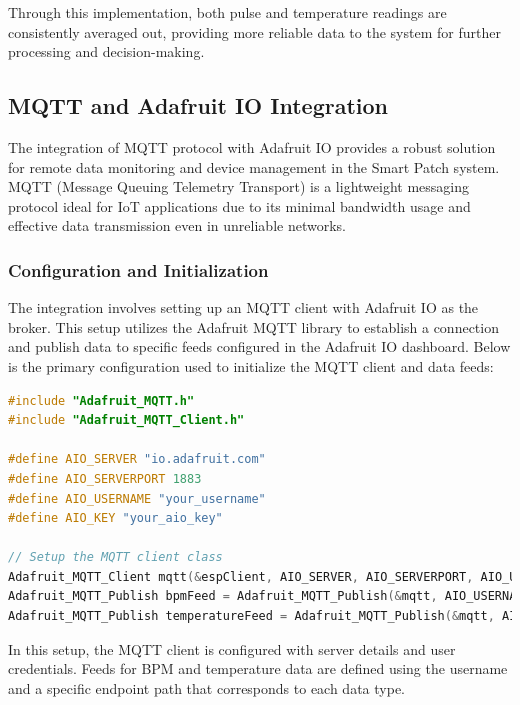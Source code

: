 \noindent Through this implementation, both pulse and temperature readings are consistently averaged out, providing more reliable data to the system for further processing and decision-making.




\subsection{MQTT and Adafruit IO Integration}

The integration of MQTT protocol with Adafruit IO provides a robust solution for remote data monitoring and device management in the Smart Patch system. MQTT (Message Queuing Telemetry Transport) is a lightweight messaging protocol ideal for IoT applications due to its minimal bandwidth usage and effective data transmission even in unreliable networks.

\subsubsection{Configuration and Initialization}

The integration involves setting up an MQTT client with Adafruit IO as the broker. This setup utilizes the Adafruit MQTT library to establish a connection and publish data to specific feeds configured in the Adafruit IO dashboard. Below is the primary configuration used to initialize the MQTT client and data feeds:

\begin{lstlisting}[language=C++, caption={MQTT and Adafruit IO Client Configuration}]
#include "Adafruit_MQTT.h"
#include "Adafruit_MQTT_Client.h"

#define AIO_SERVER "io.adafruit.com"
#define AIO_SERVERPORT 1883
#define AIO_USERNAME "your_username"
#define AIO_KEY "your_aio_key"

// Setup the MQTT client class
Adafruit_MQTT_Client mqtt(&espClient, AIO_SERVER, AIO_SERVERPORT, AIO_USERNAME, AIO_KEY);
Adafruit_MQTT_Publish bpmFeed = Adafruit_MQTT_Publish(&mqtt, AIO_USERNAME "/feeds/BPM");
Adafruit_MQTT_Publish temperatureFeed = Adafruit_MQTT_Publish(&mqtt, AIO_USERNAME "/feeds/Temperature");
\end{lstlisting}

In this setup, the MQTT client is configured with server details and user credentials. Feeds for BPM and temperature data are defined using the username and a specific endpoint path that corresponds to each data type.


